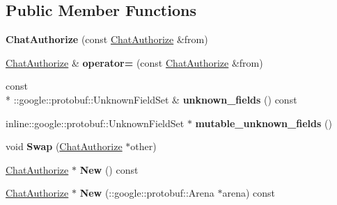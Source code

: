 \subsection*{Public Member Functions}
\begin{DoxyCompactItemize}
\item 
\hypertarget{classSimpleChat_1_1ChatAuthorize_abc1fac7df5e5e595ff6cfc111e307bf7}{{\bfseries Chat\-Authorize} (const \hyperlink{classSimpleChat_1_1ChatAuthorize}{Chat\-Authorize} \&from)}\label{classSimpleChat_1_1ChatAuthorize_abc1fac7df5e5e595ff6cfc111e307bf7}

\item 
\hypertarget{classSimpleChat_1_1ChatAuthorize_a52df37784f8170609af4c5dd14bc1315}{\hyperlink{classSimpleChat_1_1ChatAuthorize}{Chat\-Authorize} \& {\bfseries operator=} (const \hyperlink{classSimpleChat_1_1ChatAuthorize}{Chat\-Authorize} \&from)}\label{classSimpleChat_1_1ChatAuthorize_a52df37784f8170609af4c5dd14bc1315}

\item 
\hypertarget{classSimpleChat_1_1ChatAuthorize_ae41c4e349ea250cf7e0b217df18297d1}{const \\*
\-::google\-::protobuf\-::\-Unknown\-Field\-Set \& {\bfseries unknown\-\_\-fields} () const }\label{classSimpleChat_1_1ChatAuthorize_ae41c4e349ea250cf7e0b217df18297d1}

\item 
\hypertarget{classSimpleChat_1_1ChatAuthorize_ac1855f10260362d22995aa8db2ad55d3}{inline\-::google\-::protobuf\-::\-Unknown\-Field\-Set $\ast$ {\bfseries mutable\-\_\-unknown\-\_\-fields} ()}\label{classSimpleChat_1_1ChatAuthorize_ac1855f10260362d22995aa8db2ad55d3}

\item 
\hypertarget{classSimpleChat_1_1ChatAuthorize_a21801c93fdbf77f682b696414a61fd90}{void {\bfseries Swap} (\hyperlink{classSimpleChat_1_1ChatAuthorize}{Chat\-Authorize} $\ast$other)}\label{classSimpleChat_1_1ChatAuthorize_a21801c93fdbf77f682b696414a61fd90}

\item 
\hypertarget{classSimpleChat_1_1ChatAuthorize_aa001d0e9561d6311b94616b7bdec0caf}{\hyperlink{classSimpleChat_1_1ChatAuthorize}{Chat\-Authorize} $\ast$ {\bfseries New} () const }\label{classSimpleChat_1_1ChatAuthorize_aa001d0e9561d6311b94616b7bdec0caf}

\item 
\hypertarget{classSimpleChat_1_1ChatAuthorize_aa50fa8e8e9f52ec6f0185aea43e30dda}{\hyperlink{classSimpleChat_1_1ChatAuthorize}{Chat\-Authorize} $\ast$ {\bfseries New} (\-::google\-::protobuf\-::\-Arena $\ast$arena) const }\label{classSimpleChat_1_1ChatAuthorize_aa50fa8e8e9f52ec6f0185aea43e30dda}


\end{DoxyCompactItemize}
